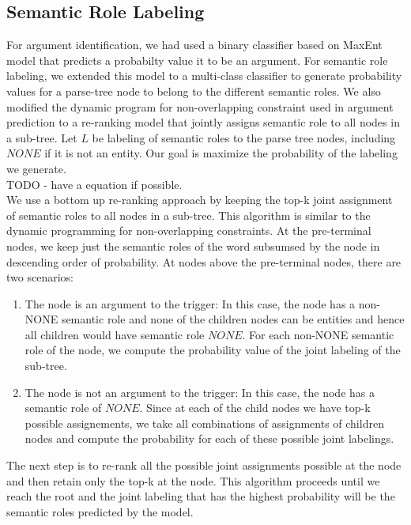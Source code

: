 \subsection{Semantic Role Labeling}
For argument identification, we had used a binary classifier based on MaxEnt model that predicts a probabilty value it to be an argument. For semantic role labeling, we extended this model to a multi-class classifier to generate probability values for a parse-tree node to belong to the different semantic roles. We also modified the dynamic program for non-overlapping constraint used in argument prediction to a re-ranking model that jointly assigns semantic role to all nodes in a sub-tree. Let $L$ be labeling of semantic roles to the parse tree nodes, including $NONE$ if it is not an entity. Our goal is maximize the probability of the labeling we generate.\\

TODO - have a equation if possible.\\

We use a bottom up re-ranking approach by keeping the top-k joint assignment of semantic roles to all nodes in a sub-tree. This algorithm is similar to the dynamic programming for non-overlapping constraints. At the pre-terminal nodes, we keep just the semantic roles of the word subsumsed by the node in descending order of probability. At nodes above the pre-terminal nodes, there are two scenarios:

\begin{enumerate}
\item The node is an argument to the trigger: In this case, the node has a non-NONE semantic role and none of the children nodes can be entities and hence all children would have semantic role $NONE$. For each non-NONE semantic role of the node, we compute the probability value of the joint labeling of the sub-tree.
\item The node is not an argument to the trigger: In this case, the node has a semantic role of $NONE$. Since at each of the child nodes we have top-k possible assignements, we take all combinations of assignments of children nodes and compute the probability for each of these possible joint labelings.
\end{enumerate}

The next step is to re-rank all the possible joint assignments possible at the node and then retain only the top-k at the node. This algorithm proceeds until we reach the root and the joint labeling that has the highest probability will be the semantic roles predicted by the model.

